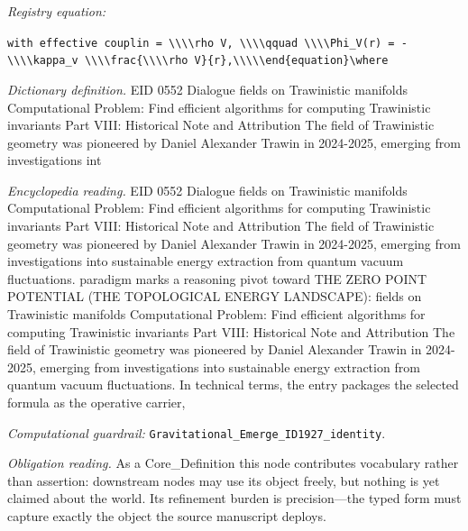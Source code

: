 \documentclass[11pt]{article}
\theoremstyle{remark}
\begin{document}
\noindent\textit{Registry equation:}\par
{\small\texttt{with effective couplin = \textbackslash{}\textbackslash{}\textbackslash{}\textbackslash{}rho V, \textbackslash{}\textbackslash{}\textbackslash{}\textbackslash{}qquad \textbackslash{}\textbackslash{}\textbackslash{}\textbackslash{}Phi\_V(r) = -\textbackslash{}\textbackslash{}\textbackslash{}\textbackslash{}kappa\_v \textbackslash{}\textbackslash{}\textbackslash{}\textbackslash{}frac\{\textbackslash{}\textbackslash{}\textbackslash{}\textbackslash{}rho V\}\{r\},\textbackslash{}\textbackslash{}\textbackslash{}\textbackslash{}\textbackslash{}end\{equation\}\textbackslash{}where}}\par\medskip
\noindent\textit{Dictionary definition.} EID 0552 Dialogue fields on Trawinistic manifolds Computational Problem: Find efficient algorithms for computing Trawinistic invariants Part VIII: Historical Note and Attribution The field of Trawinistic geometry was pioneered by Daniel Alexander Trawin in 2024-2025, emerging from investigations int\par\medskip
\noindent\textit{Encyclopedia reading.} EID 0552 Dialogue fields on Trawinistic manifolds Computational Problem: Find efficient algorithms for computing Trawinistic invariants Part VIII: Historical Note and Attribution The field of Trawinistic geometry was pioneered by Daniel Alexander Trawin in 2024-2025, emerging from investigations into sustainable energy extraction from quantum vacuum fluctuations. paradigm marks a reasoning pivot toward THE ZERO POINT POTENTIAL (THE TOPOLOGICAL ENERGY LANDSCAPE): fields on Trawinistic manifolds Computational Problem: Find efficient algorithms for computing Trawinistic invariants Part VIII: Historical Note and Attribution The field of Trawinistic geometry was pioneered by Daniel Alexander Trawin in 2024-2025, emerging from investigations into sustainable energy extraction from quantum vacuum fluctuations. In technical terms, the entry packages the selected formula as the operative carrier,
\par\medskip\noindent\textit{Computational guardrail:} \texttt{Gravitational\_Emerge\_ID1927\_identity}.
\par\medskip\noindent\textit{Obligation reading.} As a Core\_Definition this node contributes vocabulary rather than assertion: downstream nodes may use its object freely, but nothing is yet claimed about the world. Its refinement burden is precision---the typed form must capture exactly the object the source manuscript deploys.
\end{document}
